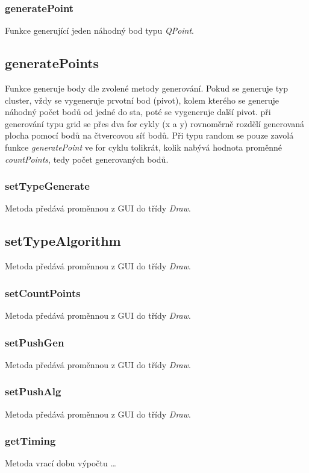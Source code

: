 \documentclass{article}
\begin{document}
\subsubsection{generatePoint}
Funkce generující jeden náhodný bod typu\emph{ QPoint}.

\subsection{generatePoints}
Funkce generuje body dle zvolené metody generování. Pokud se generuje typ cluster, vždy se vygeneruje prvotní bod (pivot), kolem kterého se generuje náhodný počet bodů od jedné do sta, poté se vygeneruje další pivot. při generování typu grid se přes dva for cykly (x a y) rovnoměrně rozdělí generovaná plocha pomocí bodů na čtvercovou síť bodů. Při typu random se pouze zavolá funkce \emph{generatePoint} ve for cyklu tolikrát, kolik nabývá hodnota proměnné \emph{countPoints}, tedy počet generovaných bodů.
\subsubsection{setTypeGenerate}
Metoda předává proměnnou z GUI do třídy \emph{Draw}.

\subsection{setTypeAlgorithm}
Metoda předává proměnnou z GUI do třídy \emph{Draw}.

\subsubsection{setCountPoints}
Metoda předává proměnnou z GUI do třídy \emph{Draw}.

\subsubsection{setPushGen}
Metoda předává proměnnou z GUI do třídy \emph{Draw}.

\subsubsection{setPushAlg}
Metoda předává proměnnou z GUI do třídy \emph{Draw}.

\subsubsection{getTiming}
Metoda vrací dobu výpočtu \ldots
\end{document}
